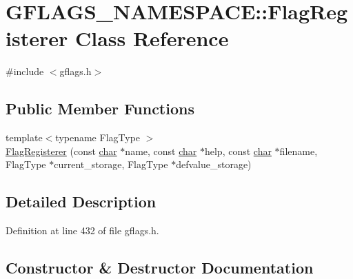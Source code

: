 \hypertarget{classGFLAGS__NAMESPACE_1_1FlagRegisterer}{}\section{G\+F\+L\+A\+G\+S\+\_\+\+N\+A\+M\+E\+S\+P\+A\+CE\+:\+:Flag\+Registerer Class Reference}
\label{classGFLAGS__NAMESPACE_1_1FlagRegisterer}


{\ttfamily \#include $<$gflags.\+h$>$}

\subsection*{Public Member Functions}
\begin{DoxyCompactItemize}
\item 
{\footnotesize template$<$typename Flag\+Type $>$ }\\\hyperlink{classGFLAGS__NAMESPACE_1_1FlagRegisterer_ab3542f1059b8584757f1e9526831ebe7}{Flag\+Registerer} (const \hyperlink{CMakeCache_8txt_afe71f11dacb15682cdc012f7208e6e09}{char} $\ast$name, const \hyperlink{CMakeCache_8txt_afe71f11dacb15682cdc012f7208e6e09}{char} $\ast$help, const \hyperlink{CMakeCache_8txt_afe71f11dacb15682cdc012f7208e6e09}{char} $\ast$filename, Flag\+Type $\ast$current\+\_\+storage, Flag\+Type $\ast$defvalue\+\_\+storage)
\end{DoxyCompactItemize}


\subsection{Detailed Description}


Definition at line 432 of file gflags.\+h.



\subsection{Constructor \& Destructor Documentation}
